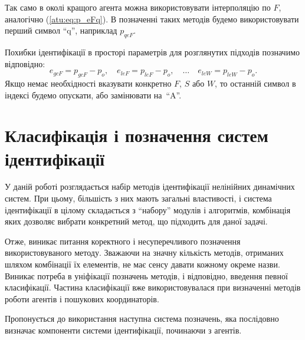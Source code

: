 Так само в околі кращого агента можна використовувати інтерполяцію по
$F$, аналогічно (\ref{atu:eq:p_eFq}). В позначенні таких методів будемо
використовувати перший символ ``q'', наприклад $p_{qeF}$.


Похибки ідентифікації в просторі параметрів для розглянутих підходів позначимо відповідно:
%
\begin{equation}
  e_{gcF} = p_{gcF} - p_o,
  \quad
  e_{leF} = p_{leF} - p_o,
  \quad
  \ldots
  \quad
  e_{leW} = p_{leW} - p_o.
  \label{atu:eq:e_xx}
\end{equation}
%
Якщо немає необхідності вказувати конкретно
$ F $,
$ S $ або
$ W $, то останній символ в індексі будемо опускати, або замінювати на~``A''.







\section{Класифікація і позначення систем ідентифікації}%
\label{atu:id_classification}

У даній роботі розглядається набір методів ідентифікації нелінійних динамічних
систем. При цьому, більшість з них мають загальні властивості, і система
ідентифікації в цілому складається з ``набору'' модулів і алгоритмів,
комбінація яких дозволяє вибрати конкретний метод, що підходить для даної
задачі.

Отже, виникає питання коректного і несуперечливого позначення
використовуваного методу. Зважаючи на значну кількість методів,
отриманих шляхом комбінації їх елементів, не має сенсу давати
кожному окреме назви. Виникає потреба в уніфікації позначень
методів, і відповідно, введення певної класифікації. Частина
класифікації вже використовувалася при визначенні методів
роботи агентів і пошукових координаторів.

Пропонується до використання наступна система позначень, яка послідовно визначає
компоненти системи ідентифікації, починаючи з агентів.

